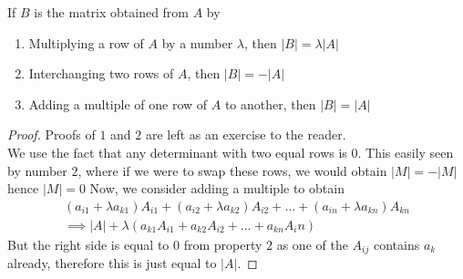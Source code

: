 \documentclass[a4paper]{article}
\theoremstyle{plain}
\newtheorem*{cor}{Corollary}
\theoremstyle{definition}
\theoremstyle{remark}
\begin{document}
\begin{tcolorbox}[colback=black!3!white,colframe=black!60!white,title=\begin{cor}Elementary Row Operations \label{Elementary Row Operations}\end{cor}]
If $B$ is the matrix obtained from $A$ by
        \begin{enumerate}
        	\item Multiplying a row of $A$ by a number $\lambda$, then $|B|=\lambda|A|$ 
		\item Interchanging two rows of $A$, then $|B| = -|A|$ 
		\item Adding a multiple of one row of $A$ to another, then $|B|=|A|$
        \end{enumerate}
	\begin{proof}
              		Proofs of $1$ and $2$ are left as an exercise to the reader.\\
			We use the fact that any determinant with two equal rows is $0$. This easily seen by number $2$, where if we were to swap these rows, we would obtain $|M| = -|M|$ hence $|M| = 0$ Now, we consider adding a multiple to obtain
			\begin{align}
				(a_{i1}+\lambda a_{k1})A_{i1}+(a_{i2}+\lambda a_{k2})A_{i2}+\ldots+(a_{in}+\lambda a_{kn})A_{kn} \\
			\implies |A| + \lambda(a_{k1}A_{i1}+a_{k2}A_{i2} + \ldots + a_{kn}A_in)
			\end{align}
	But the right side is equal to $0$ from property $2$ as one of the $A_{ij}$ contains $a_k$ already, therefore this is just equal to $|A|$.
	\end{proof}
\end{tcolorbox}
\end{document}

